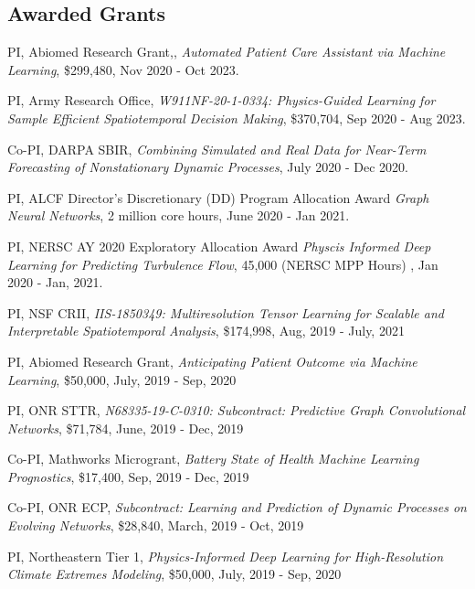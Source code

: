 \documentclass[margin,line]{res}
\begin{document}
\begin{resume}
\section{\sc Awarded Grants}
\begin{enumerate}[label={[G\arabic*]}]
\item PI, {Abiomed Research Grant},, \textit{Automated Patient Care Assistant via Machine Learning}, \$299,480, Nov 2020 - Oct 2023.
\item PI,   Army Research Office,  \textit{W911NF-20-1-0334: Physics-Guided Learning for Sample Efficient Spatiotemporal Decision Making}, \$370,704, Sep 2020 - Aug 2023. 
\item Co-PI, DARPA SBIR, \textit{Combining Simulated and Real Data
for Near-Term Forecasting of Nonstationary Dynamic Processes}, July 2020 - Dec 2020.
\item PI,  ALCF Director’s Discretionary (DD) Program Allocation Award \textit{Graph Neural Networks},  2 million core hours, June 2020 - Jan 2021.
\item PI,  NERSC AY 2020 Exploratory Allocation Award \textit{Physcis Informed Deep Learning for Predicting Turbulence Flow}, 45,000  (NERSC MPP Hours) , Jan 2020 - Jan, 2021.
\item  PI, {NSF CRII},    \textit{IIS-1850349: Multiresolution Tensor Learning for Scalable and Interpretable Spatiotemporal Analysis},    \$174,998,  Aug, 2019 - July, 2021

\item PI, {Abiomed Research Grant},    \textit{Anticipating Patient Outcome via Machine Learning}, \$50,000, July, 2019 - Sep, 2020

\item PI,  {ONR STTR}, \textit{N68335-19-C-0310: Subcontract: Predictive Graph Convolutional Networks},  \$71,784, June, 2019 - Dec, 2019


\item Co-PI,  {Mathworks Microgrant},    \textit{Battery State of Health Machine Learning Prognostics}, \$17,400,  Sep, 2019 - Dec, 2019
 
\item Co-PI,  {ONR ECP}, \textit{Subcontract: Learning and Prediction of Dynamic Processes on Evolving Networks}, \$28,840,  March, 2019 - Oct, 2019	

\item PI,  Northeastern Tier 1, \textit{Physics-Informed Deep Learning for High-Resolution Climate Extremes Modeling}, \$50,000, July, 2019 - Sep, 2020


\end{enumerate}
\end{resume}
\end{document}
